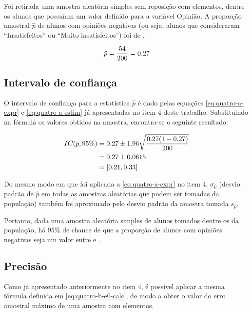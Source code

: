 

Foi retirada uma amostra aleatória simples sem reposição com \CINCOn elementos, dentre os \CINCON alunos que possuíam um valor definido para a variável Opinião. 
A proporção amostral $\hat{p}$ de alunos com opiniões negativas (ou seja, alunos que consideraram ``Insatisfeitos'' ou ``Muito insatisfeitos'') foi de \CINCOpAmostral.

\begin{align*} 
	\hat{p}  &= {\frac{54}{200}} = 0.27 \nonumber \\
\end{align*}


\subsection{Intervalo de confiança}
O intervalo de confiança para a estatística $\hat{p}$ é dado pelas equações \eqref{eq:quatro-a-expr} e \eqref{eq:quatro-a-estim} já apresentadas no item 4 deste trabalho.
Substituindo na fórmula os valores obtidos na amostra, encontra-se o seguinte resultado:

\begin{align} 
	IC(p, 95\%) 
	            &= 0.27 \pm 1.96 \sqrt{\frac{0.27 (1- 0.27)}{200}} \nonumber \\
	            &= 0.27 \pm 0.0615 \nonumber \\
	            \label{eq:cinco-a-result}
	            &= [0.21, 0.33]
\end{align}

Do mesmo modo em que foi aplicada a \autoref{eq:quatro-a-expr} no item 4, $\sigma_{\hat{p}}$ (desvio padrão de $\hat{p}$ em todas as amostras aleatórias que podem ser tomadas da população) também foi aproximado pelo desvio padrão da amostra tomada $s_{\hat{p}}$.

Portanto, dada uma amostra aleatória simples de \CINCOn alunos tomados dentre os \CINCON da população, há 95\% de chance de que a proporção de alunos com opiniões negativas seja um valor entre \CINCOAICinf e \CINCOAICsup.


\subsection{Precisão}
Como já apresentado anteriormente no item 4, é possível aplicar a mesma fórmula definida em \eqref{eq:quatro-b-e0-calc}, de modo a obter o valor do erro amostral máximo de uma amostra com \CINCOn elementos.

